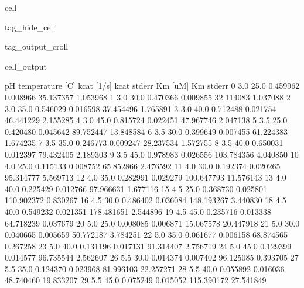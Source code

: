 \documentclass[letterpaper,10pt,english]{jupyterBook}
\begin{document}
\begin{sphinxuseclass}{cell}
\begin{sphinxuseclass}{tag_hide_cell}
\begin{sphinxuseclass}{tag_output_croll}
\begin{sphinxVerbatimOutput}
\begin{sphinxuseclass}{cell_output}
\begin{sphinxVerbatim}[commandchars=\\\{\}]
     pH  temperature [C]  kcat [1/s]  kcat stderr     Km [uM]  Km stderr  \PYGZbs{}
0   3.0             25.0    0.459962     0.008966   35.137357   1.053968   
1   3.0             30.0    0.470366     0.009855   32.114083   1.037088   
2   3.0             35.0    0.546029     0.016598   37.454496   1.765891   
3   3.0             40.0    0.712488     0.021754   46.441229   2.155285   
4   3.0             45.0    0.815724     0.022451   47.967746   2.047138   
5   3.5             25.0    0.420480     0.045642   89.752447  13.848584   
6   3.5             30.0    0.399649     0.007455   61.224383   1.674235   
7   3.5             35.0    0.246773     0.009247   28.237534   1.572755   
8   3.5             40.0    0.650031     0.012397   79.432405   2.189303   
9   3.5             45.0    0.978983     0.026556  103.784356   4.040850   
10  4.0             25.0    0.115133     0.008752   65.852866   2.476592   
11  4.0             30.0    0.192374     0.020265   95.314777   5.569713   
12  4.0             35.0    0.282991     0.029279  100.647793  11.576143   
13  4.0             40.0    0.225429     0.012766   97.966631   1.677116   
15  4.5             25.0    0.368730     0.025801  110.902372   0.830267   
16  4.5             30.0    0.486402     0.036084  148.193267   3.440830   
18  4.5             40.0    0.549232     0.021351  178.481651   2.544896   
19  4.5             45.0    0.235716     0.013338   64.718239   0.037679   
20  5.0             25.0    0.008085     0.006871   15.067578  20.447918   
21  5.0             30.0    0.040665     0.005659   50.772187   3.784251   
22  5.0             35.0    0.061677     0.006158   68.874565   0.267258   
23  5.0             40.0    0.131196     0.017131   91.314407   2.756719   
24  5.0             45.0    0.129399     0.014577   96.735544   2.562607   
26  5.5             30.0    0.014374     0.007402   96.125085   0.393705   
27  5.5             35.0    0.124370     0.023968   81.996103  22.257271   
28  5.5             40.0    0.055892     0.016036   48.740460  19.833207   
29  5.5             45.0    0.075249     0.015052  115.390172  27.541849   


\end{sphinxVerbatim}
\end{sphinxuseclass}
\end{sphinxVerbatimOutput}
\end{sphinxuseclass}
\end{sphinxuseclass}
\end{sphinxuseclass}
\end{document}
